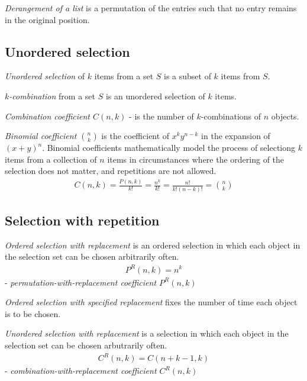 {\it Derangement of a list} is a permutation of the entries such that no entry remains in the original position.

\subsection{Unordered selection}

{\it Unordered selection} of $k$ items from a set $S$ is a subset of $k$ items from $S$.

{\it $k$-combination} from a set $S$ is an unordered selection of $k$ items.

{\it Combination coefficient $C(n,k)$} - is the number of $k$-combinations of $n$ objects.

{\it Binomial coefficient $\binom{n}{k}$} is the coefficient of $x^{k}y^{n-k}$ in the expansion of $(x+y)^{n}$. Binomial coefficients mathematically model the process of selectiong $k$ items from a collection of $n$ items in circumstances where the ordering of the selection does not matter, and repetitions are not allowed.
\begin{eqnarray*}
    C(n,k)=\frac{P(n,k)}{k!}=\frac{n^{\underline{k}}}{k!}=\frac{n!}{k!(n-k)!}=\binom{n}{k}
\end{eqnarray*}

\subsection{Selection with repetition}

{\it Ordered selection with replacement} is an ordered selection in which each object in the selection set can be chosen arbitrarily often.
\begin{eqnarray*}
    P^{R}(n,k)=n^{k}
\end{eqnarray*}
 - {\it permutation-with-replacement coefficient $P^{R}(n,k)$}

{\it Ordered selection with specified replacement} fixes the number of time each object is to be chosen.

{\it Unordered selection with replacement} is a selection in which each object in the selection set can be chosen arbutrarily often.
\begin{eqnarray*}
    C^{R}(n,k)=C(n+k-1,k)
\end{eqnarray*}
- {\it combination-with-replacement coefficient $C^{R}(n,k)$}

